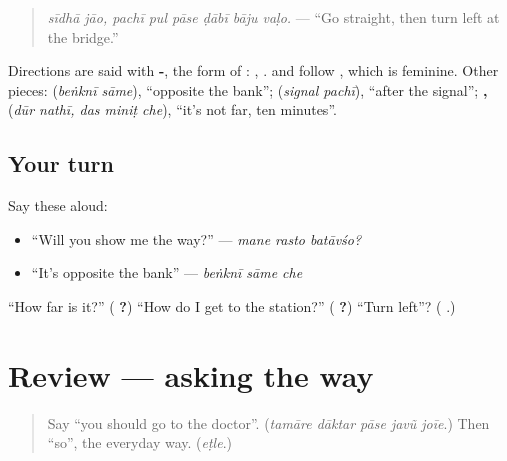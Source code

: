 \begin{quote}
\emph{sīdhā jāo, pachī pul pāse ḍābī bāju vaḷo.} — \textquotedblleft{}Go straight, then turn left at the bridge.\textquotedblright{}
\end{quote}

Directions are said with \textbf{-}, the form of \textbf{ }: \textbf{}, \textbf{}. \textbf{} and \textbf{} follow \textbf{}, which is feminine. Other pieces: \textbf{ } (\emph{beṅknī sāme}), \textquotedblleft{}opposite the bank\textquotedblright{}; \textbf{ } (\emph{signal pachī}), \textquotedblleft{}after the signal\textquotedblright{}; \textbf{ ,   } (\emph{dūr nathī, das miniṭ che}), \textquotedblleft{}it's not far, ten minutes\textquotedblright{}.

\subsection*{Your turn}
Say these aloud:

\begin{itemize}
\raggedright
  \item \textquotedblleft{}Will you show me the way?\textquotedblright{} — \emph{mane rasto batāvśo?}
  \item \textquotedblleft{}It's opposite the bank\textquotedblright{} — \emph{beṅknī sāme che}
\end{itemize}

\begin{tcolorbox}[breakable,colback=teal!4,colframe=teal!35!black,title={Before you move on}]
\textquotedblleft{}How far is it?\textquotedblright{} (\textbf{  ?}) \textquotedblleft{}How do I get to the station?\textquotedblright{} (\textbf{   ?}) \textquotedblleft{}Turn left\textquotedblright{}? (\textbf{  }.)
\end{tcolorbox}
\section[(review)]{Review — asking the way}

\label{lesson:GU-R279-asking-the-way}



\begin{quote}
Say \textquotedblleft{}you should go to the doctor\textquotedblright{}. (\emph{tamāre dāktar pāse javũ joīe}.) Then \textquotedblleft{}so\textquotedblright{}, the everyday way. (\emph{eṭle}.)
\end{quote}

